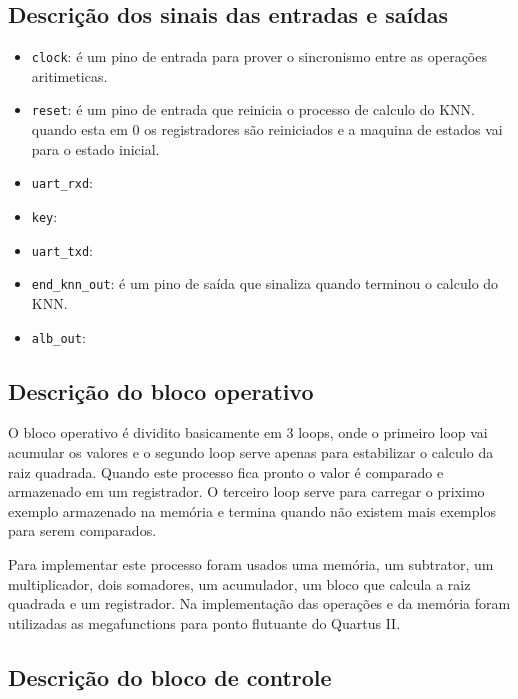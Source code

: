 \documentclass[12pt]{article}
\begin{document}
\subsection{Descrição dos sinais das entradas e saídas}

\begin{itemize}

\item \verb|clock|: é um pino de entrada para prover o sincronismo entre as
operações aritimeticas.

\item \verb|reset|: é um pino de entrada que reinicia o processo de calculo do
KNN. quando esta em 0 os registradores são reiniciados e a maquina de estados
vai para o estado inicial.

\item \verb|uart_rxd|:

\item \verb|key|:

\item \verb|uart_txd|:

\item \verb|end_knn_out|: é um pino de saída que sinaliza quando 
terminou o calculo do KNN.

\item \verb|alb_out|:

\end{itemize}

\subsection{Descrição do bloco operativo}

O bloco operativo é dividito basicamente em 3 loops, onde o primeiro loop vai
acumular os valores e o segundo loop serve apenas para estabilizar o calculo da
raiz quadrada. Quando este processo fica pronto o valor é comparado e
armazenado em um registrador. O terceiro loop serve para carregar o priximo
exemplo armazenado na memória e termina quando não existem mais exemplos para
serem comparados.

Para implementar este processo foram usados uma memória, um subtrator, um 
multiplicador, dois somadores, um acumulador, um bloco que calcula a raiz 
quadrada e um registrador.
Na implementação das operações e da memória foram utilizadas as megafunctions 
para ponto flutuante do Quartus II.


\subsection{Descrição do bloco de controle}
\end{document}

